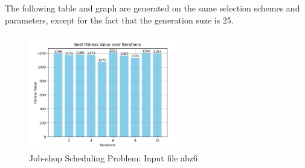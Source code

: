 \documentclass[12pt]{article}
\begin{document}
The following table and graph are generated on the same selection schemes and parameters, except for the fact that the generation suze is 25. 

\begin{figure}[h]
    \centering
    \includegraphics[width=0.6\textwidth]{images/JSSP_rntrbestscorelessgensABZ6.png}
    \caption{Job-shop Scheduling Problem: Input file abz6}
\end{figure}
\end{document}

